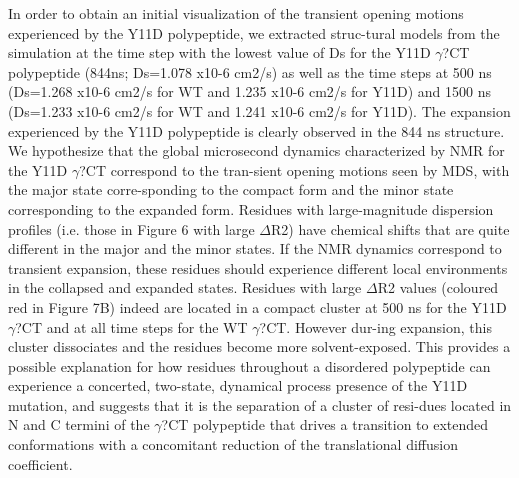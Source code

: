 In order to obtain an initial visualization of the transient opening motions experienced by the Y11D polypeptide, we extracted struc-tural models from the simulation at the time step with the lowest value of Ds for the Y11D $\gamma$?CT polypeptide (844ns; Ds=1.078 x10-6 cm2/s) as well as the time steps at 500 ns (Ds=1.268 x10-6 cm2/s for WT and 1.235 x10-6 cm2/s for Y11D) and 1500 ns (Ds=1.233 x10-6 cm2/s for WT and 1.241 x10-6 cm2/s for Y11D). The expansion experienced by the Y11D polypeptide is clearly observed in the 844 ns structure. We hypothesize that the global microsecond dynamics characterized by NMR for the Y11D $\gamma$?CT correspond to the tran-sient opening motions seen by MDS, with the major state corre-sponding to the compact form and the minor state corresponding to the expanded form. Residues with large-magnitude dispersion profiles (i.e. those in Figure 6 with large $\Delta$R2) have chemical shifts that are quite different in the major and the minor states. If the NMR dynamics correspond to transient expansion, these residues should experience different local environments in the collapsed and expanded states. Residues with large $\Delta$R2 values (coloured red in Figure 7B) indeed are located in a compact cluster at 500 ns for the Y11D $\gamma$?CT and at all time steps for the WT $\gamma$?CT. However dur-ing expansion, this cluster dissociates and the residues become more solvent-exposed. This provides a possible explanation for how residues throughout a disordered polypeptide can experience a concerted, two-state, dynamical process presence of the Y11D mutation, and suggests that it is the separation of a cluster of resi-dues located in N and C termini of the $\gamma$?CT polypeptide that drives a transition to extended conformations with a concomitant  reduction of the translational diffusion coefficient.

